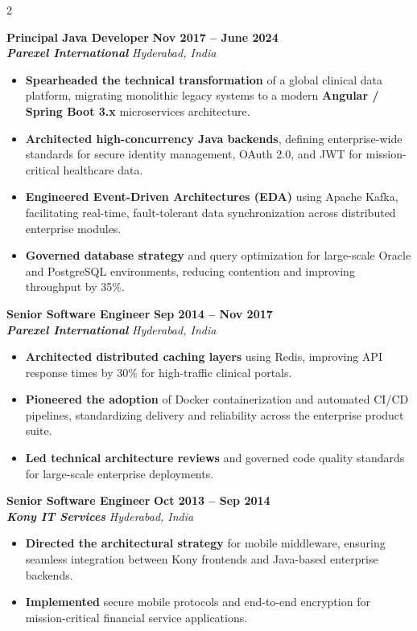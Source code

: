 \documentclass[10pt,a4paper]{article}
\newcommand{\job}[4]{
    \vspace{4pt} 
    \noindent
    {\small\bfseries\color{textgray} #1} \hfill {\footnotesize\bfseries #2} \\[1pt]
    {\scriptsize\textbf{\textit{\color{headerblue} #3}}} \hfill {\scriptsize\textit{#4}}
}
\begin{document}
\begin{paracol}{2}
\vspace{8pt} 
\job{Principal Java Developer}{Nov 2017 -- June 2024}{Parexel International}{Hyderabad, India}
\begin{itemize}
    \item \textbf{Spearheaded the technical transformation} of a global clinical data platform, migrating monolithic legacy systems to a modern \textbf{Angular / Spring Boot 3.x} microservices architecture.
    \item \textbf{Architected high-concurrency Java backends}, defining enterprise-wide standards for secure identity management, OAuth 2.0, and JWT for mission-critical healthcare data.
    \item \textbf{Engineered Event-Driven Architectures (EDA)} using Apache Kafka, facilitating real-time, fault-tolerant data synchronization across distributed enterprise modules.
    \item \textbf{Governed database strategy} and query optimization for large-scale Oracle and PostgreSQL environments, reducing contention and improving throughput by 35\%.
\end{itemize}

\vspace{8pt} 
\job{Senior Software Engineer}{Sep 2014 -- Nov 2017}{Parexel International}{Hyderabad, India}
\begin{itemize}
    \item \textbf{Architected distributed caching layers} using Redis, improving API response times by 30\% for high-traffic clinical portals.
    \item \textbf{Pioneered the adoption} of Docker containerization and automated CI/CD pipelines, standardizing delivery and reliability across the enterprise product suite.
    \item \textbf{Led technical architecture reviews} and governed code quality standards for large-scale enterprise deployments.
\end{itemize}

\vspace{8pt} 
\job{Senior Software Engineer}{Oct 2013 -- Sep 2014}{Kony IT Services}{Hyderabad, India}
\begin{itemize}
    \item \textbf{Directed the architectural strategy} for mobile middleware, ensuring seamless integration between Kony frontends and Java-based enterprise backends.
    \item \textbf{Implemented} secure mobile protocols and end-to-end encryption for mission-critical financial service applications.
\end{itemize}


\end{paracol}
\end{document}
